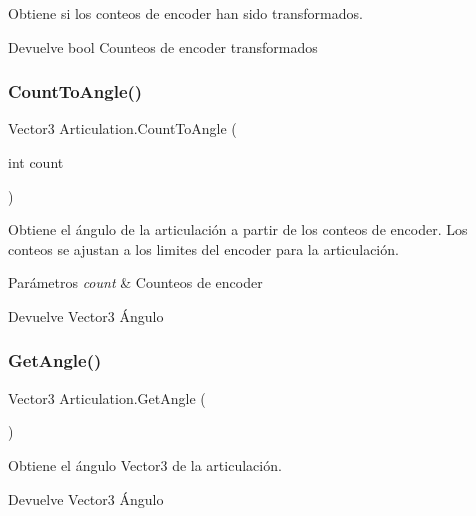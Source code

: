 Obtiene si los conteos de encoder han sido transformados. \begin{DoxyReturn}{Devuelve}
bool Counteos de encoder transformados 
\end{DoxyReturn}
\mbox{\label{class_articulation_a8b735ad392d0329c76f91e95768c026d}} 
\subsubsection{\texorpdfstring{CountToAngle()}{CountToAngle()}}
{\footnotesize\ttfamily Vector3 Articulation.\+Count\+To\+Angle (\begin{DoxyParamCaption}\item[{int}]{count }\end{DoxyParamCaption})\hspace{0.3cm}{\ttfamily [inline]}}

Obtiene el ángulo de la articulación a partir de los conteos de encoder. Los conteos se ajustan a los limites del encoder para la articulación. 
\begin{DoxyParams}{Parámetros}
{\em count} & Counteos de encoder \\
\hline
\end{DoxyParams}
\begin{DoxyReturn}{Devuelve}
Vector3 Ángulo 
\end{DoxyReturn}
\mbox{\label{class_articulation_af80ebaf44266ca6e4042b23d3a3392c9}} 
\subsubsection{\texorpdfstring{GetAngle()}{GetAngle()}}
{\footnotesize\ttfamily Vector3 Articulation.\+Get\+Angle (\begin{DoxyParamCaption}{ }\end{DoxyParamCaption})\hspace{0.3cm}{\ttfamily [inline]}}

Obtiene el ángulo Vector3 de la articulación. \begin{DoxyReturn}{Devuelve}
Vector3 Ángulo 
\end{DoxyReturn}
\mbox{\label{class_articulation_ac933fade16023f1adb224eed98427cb9}} 
